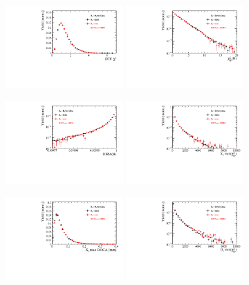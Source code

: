 \begin{figure}[h]
\centering
\includegraphics[height=!,width=0.4\textwidth]{figs/dataVsMC/finalState_norm/Ds2all_DTF_CHI2NDOF.pdf}
\includegraphics[height=!,width=0.4\textwidth]{figs/dataVsMC/finalState_norm/Ds2all_Bs_IPCHI2_OWNPV.pdf}

\includegraphics[height=!,width=0.4\textwidth]{figs/dataVsMC/finalState_norm/Ds2all_Bs_DIRA_OWNPV.pdf}
\includegraphics[height=!,width=0.4\textwidth]{figs/dataVsMC/finalState_norm/Ds2all_XsDaughters_min_IPCHI2.pdf}

\includegraphics[height=!,width=0.4\textwidth]{figs/dataVsMC/finalState_norm/Ds2all_Xs_max_DOCA.pdf}
\includegraphics[height=!,width=0.4\textwidth]{figs/dataVsMC/finalState_norm/Ds2all_DsDaughters_min_IPCHI2.pdf}


\end{figure}
